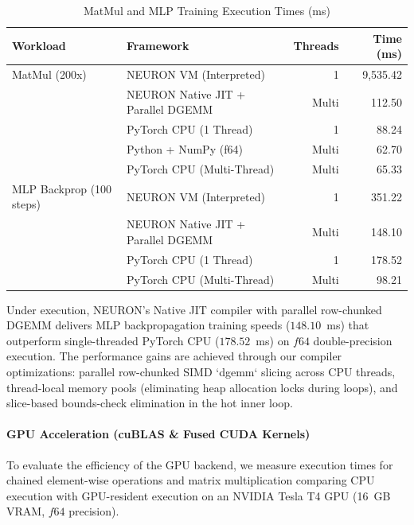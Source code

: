 \documentclass[11pt,a4paper]{article}
\begin{document}
\begin{table}[h]
\centering
\caption{MatMul and MLP Training Execution Times (ms)}
\label{tab:benchmarks}
\begin{tabular}{llrr}
\toprule
\textbf{Workload} & \textbf{Framework} & \textbf{Threads} & \textbf{Time (ms)} \\
\midrule
MatMul (200x) & NEURON VM (Interpreted) & 1 & 9,535.42 \\
& NEURON Native JIT + Parallel DGEMM & Multi & 112.50 \\
& PyTorch CPU (1 Thread) & 1 & 88.24 \\
& Python + NumPy (f64) & Multi & 62.70 \\
& PyTorch CPU (Multi-Thread) & Multi & 65.33 \\
\midrule
MLP Backprop (100 steps) & NEURON VM (Interpreted) & 1 & 351.22 \\
& NEURON Native JIT + Parallel DGEMM & Multi & 148.10 \\
& PyTorch CPU (1 Thread) & 1 & 178.52 \\
& PyTorch CPU (Multi-Thread) & Multi & 98.21 \\
\bottomrule
\end{tabular}
\end{table}

Under execution, NEURON's Native JIT compiler with parallel row-chunked DGEMM delivers MLP backpropagation training speeds ($148.10$~ms) that outperform single-threaded PyTorch CPU ($178.52$~ms) on $f64$ double-precision execution. The performance gains are achieved through our compiler optimizations: parallel row-chunked SIMD `dgemm` slicing across CPU threads, thread-local memory pools (eliminating heap allocation locks during loops), and slice-based bounds-check elimination in the hot inner loop.

\paragraph{GPU Acceleration (cuBLAS \& Fused CUDA Kernels)}
To evaluate the efficiency of the GPU backend, we measure execution times for chained element-wise operations and matrix multiplication comparing CPU execution with GPU-resident execution on an NVIDIA Tesla T4 GPU (16~GB VRAM, $f64$ precision).
\end{document}
